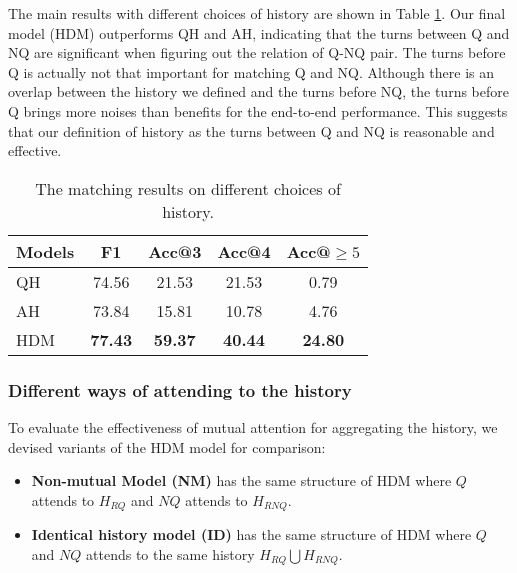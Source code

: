 The main results with different choices of history are shown in 
Table \ref{tab:historychoice}. %
Our final model (HDM) outperforms QH and AH, indicating that the turns between Q and NQ are significant when figuring out the relation of Q-NQ pair. The turns before Q is actually not that important for matching Q and NQ. 
Although there is an overlap between the history we defined and 
the turns before NQ, 
the turns before Q brings more noises than benefits for
the end-to-end performance. This suggests that our definition of 
history as the turns between Q and NQ is reasonable and effective.

\begin{table}
	
	\centering
	\begin{tabular}{p{1.5cm}<{\centering}|c|ccc}
		\toprule[1.3pt]
		Models &F1&Acc@3&Acc@4&Acc@$\geq5$\\
		\midrule[1pt]
		QH&74.56&21.53&21.53&0.79 \\	
		AH&73.84&15.81&10.78&4.76 \\
		HDM&\textbf{77.43}&\textbf{59.37}&\textbf{40.44}&\textbf{24.80}\\
		\bottomrule[1.3pt]
	\end{tabular}
	\vspace{-0.25cm}
	\caption{The matching results on different choices of history.}
	\label{tab:historychoice}
\end{table}

\subsubsection{Different ways of attending to the history}

To evaluate the effectiveness of mutual attention for aggregating the 
history, we devised variants of the HDM model for comparison:
\begin{itemize}
	\item \textbf{Non-mutual Model (NM)} has the same structure of HDM 
	where $Q$ attends to $H_{RQ}$ and $NQ$ attends to $H_{RNQ}$.
	\item \textbf{Identical history model (ID)} has the same structure of HDM where $Q$ and $NQ$ attends to the same history $H_{RQ}\bigcup H_{RNQ}$.
\end{itemize}


